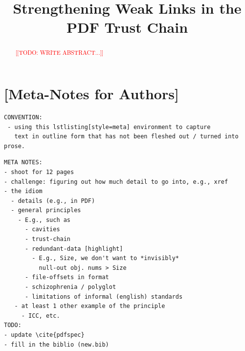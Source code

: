 \documentclass[conference,12pt]{IEEEtran}
\newcommand{\note}[1]{\noteYes{#1}}
\newcommand{\noteYes}[1]{\textcolor{red}{[[#1]]}}
\newcommand{\todo}[1]{\note{TODO: #1}}
\begin{document}
\date{}

\title{Strengthening Weak Links in the PDF Trust Chain}

\author{
     \and
}

\maketitle

\begin{abstract}

\todo{WRITE ABSTRACT...}
  
\end{abstract}

\section{[Meta-Notes for Authors]}

\begin{lstlisting}[style=meta]
CONVENTION:
 - using this lstlisting[style=meta] environment to capture
   text in outline form that has not been fleshed out / turned into prose.
\end{lstlisting}

\begin{lstlisting}[style=meta]
META NOTES:  
- shoot for 12 pages
- challenge: figuring out how much detail to go into, e.g., xref
- the idiom
  - details (e.g., in PDF)
  - general principles
    - E.g., such as
      - cavities
      - trust-chain 
      - redundant-data [highlight]
        - E.g., Size, we don't want to *invisibly*
          null-out obj. nums > Size
      - file-offsets in format
      - schizophrenia / polyglot
      - limitations of informal (english) standards
   - at least 1 other example of the principle
     - ICC, etc.
TODO:
- update \cite{pdfspec}
- fill in the biblio (new.bib)
\end{lstlisting}

\end{document}
